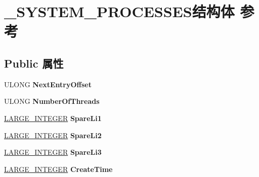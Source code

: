 \hypertarget{struct___s_y_s_t_e_m___p_r_o_c_e_s_s_e_s}{}\section{\+\_\+\+S\+Y\+S\+T\+E\+M\+\_\+\+P\+R\+O\+C\+E\+S\+S\+E\+S结构体 参考}
\label{struct___s_y_s_t_e_m___p_r_o_c_e_s_s_e_s}
\subsection*{Public 属性}
\begin{DoxyCompactItemize}
\item 
\mbox{\label{struct___s_y_s_t_e_m___p_r_o_c_e_s_s_e_s_a3d0fe1e348975f9b8704ca63012063c0}} 
U\+L\+O\+NG {\bfseries Next\+Entry\+Offset}
\item 
\mbox{\label{struct___s_y_s_t_e_m___p_r_o_c_e_s_s_e_s_a9827f7617c489359922529dab8596240}} 
U\+L\+O\+NG {\bfseries Number\+Of\+Threads}
\item 
\mbox{\label{struct___s_y_s_t_e_m___p_r_o_c_e_s_s_e_s_ae4359170d65faf521c43b74992b8d226}} 
\hyperlink{union___l_a_r_g_e___i_n_t_e_g_e_r}{L\+A\+R\+G\+E\+\_\+\+I\+N\+T\+E\+G\+ER} {\bfseries Spare\+Li1}
\item 
\mbox{\label{struct___s_y_s_t_e_m___p_r_o_c_e_s_s_e_s_a61972a3dd8a9ccee0584405ad42d73f6}} 
\hyperlink{union___l_a_r_g_e___i_n_t_e_g_e_r}{L\+A\+R\+G\+E\+\_\+\+I\+N\+T\+E\+G\+ER} {\bfseries Spare\+Li2}
\item 
\mbox{\label{struct___s_y_s_t_e_m___p_r_o_c_e_s_s_e_s_ac4e16bcd001eb22884497f19c52487cf}} 
\hyperlink{union___l_a_r_g_e___i_n_t_e_g_e_r}{L\+A\+R\+G\+E\+\_\+\+I\+N\+T\+E\+G\+ER} {\bfseries Spare\+Li3}
\item 
\mbox{\label{struct___s_y_s_t_e_m___p_r_o_c_e_s_s_e_s_a9c09a379224451c1d092d4a8b850d73e}} 
\hyperlink{union___l_a_r_g_e___i_n_t_e_g_e_r}{L\+A\+R\+G\+E\+\_\+\+I\+N\+T\+E\+G\+ER} {\bfseries Create\+Time}

\end{DoxyCompactItemize}
